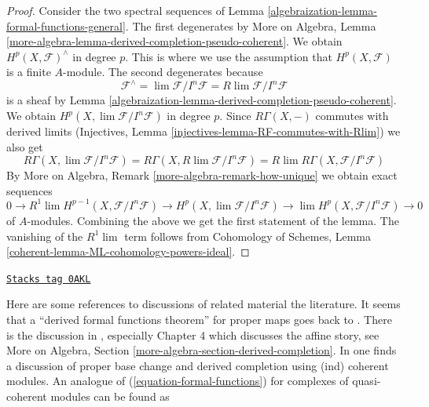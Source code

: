 \begin{proof}

Consider the two spectral sequences of
Lemma \ref{algebraization-lemma-formal-functions-general}.
The first degenerates by More on Algebra, Lemma
\ref{more-algebra-lemma-derived-completion-pseudo-coherent}.
We obtain $H^p(X, \mathcal{F})^\wedge$ in degree $p$.
This is where we use the assumption that $H^p(X, \mathcal{F})$ is
a finite $A$-module. The second degenerates because
$$
\mathcal{F}^\wedge = \lim \mathcal{F}/I^n\mathcal{F} =
R\lim \mathcal{F}/I^n\mathcal{F}
$$
is a sheaf by Lemma \ref{algebraization-lemma-derived-completion-pseudo-coherent}.
We obtain $H^p(X, \lim \mathcal{F}/I^n\mathcal{F})$ in degree $p$.
Since $R\Gamma(X, -)$ commutes with derived limits
(Injectives, Lemma \ref{injectives-lemma-RF-commutes-with-Rlim})
we also get
$$
R\Gamma(X, \lim \mathcal{F}/I^n\mathcal{F}) =
R\Gamma(X, R\lim \mathcal{F}/I^n\mathcal{F}) =
R\lim R\Gamma(X, \mathcal{F}/I^n\mathcal{F})
$$
By More on Algebra, Remark
\ref{more-algebra-remark-how-unique}
we obtain exact sequences
$$
0 \to
R^1\lim H^{p - 1}(X, \mathcal{F}/I^n\mathcal{F}) \to
H^p(X, \lim \mathcal{F}/I^n\mathcal{F}) \to
\lim H^p(X, \mathcal{F}/I^n\mathcal{F}) \to 0
$$
of $A$-modules. Combining the above we get the first statement of the lemma.
The vanishing of the $R^1\lim$ term follows from
Cohomology of Schemes, Lemma \ref{coherent-lemma-ML-cohomology-powers-ideal}.
\end{proof}

\begin{remark}[References]
\label{algebraization-remark-references}
\href{https://stacks.math.columbia.edu/tag/0AKL}{\texttt{Stacks tag 0AKL}}

Here are some references to discussions of related material the literature.
It seems that a ``derived formal functions theorem'' for proper maps
goes back to \cite[Theorem 6.3.1]{lurie-thesis}.
There is the discussion in \cite{dag12}, especially
Chapter 4 which discusses the affine story, see
More on Algebra, Section \ref{more-algebra-section-derived-completion}.
In \cite[Section 2.9]{G-R} one finds a discussion of proper base change and
derived completion using (ind) coherent modules.
An analogue of (\ref{equation-formal-functions})
for complexes of quasi-coherent modules can be found as
\cite[Theorem 6.5]{HL-P}
\end{remark}

